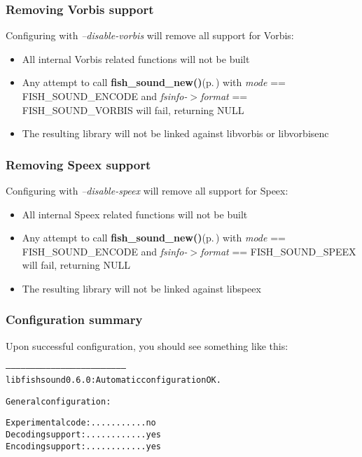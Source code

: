 \subsubsection{Removing Vorbis support}\label{no_vorbis}
Configuring with {\em --disable-vorbis\/} will remove all support for Vorbis:\begin{itemize}
\item All internal Vorbis related functions will not be built\item Any attempt to call {\bf fish\_\-sound\_\-new()}{\rm (p.\,\pageref{fishsound_8h_a4})} with {\em mode\/} == FISH\_\-SOUND\_\-ENCODE and {\em fsinfo-$>$format\/} == FISH\_\-SOUND\_\-VORBIS will fail, returning NULL\item The resulting library will not be linked against libvorbis or libvorbisenc\end{itemize}
\subsubsection{Removing Speex support}\label{no_speex}
Configuring with {\em --disable-speex\/} will remove all support for Speex:\begin{itemize}
\item All internal Speex related functions will not be built\item Any attempt to call {\bf fish\_\-sound\_\-new()}{\rm (p.\,\pageref{fishsound_8h_a4})} with {\em mode\/} == FISH\_\-SOUND\_\-ENCODE and {\em fsinfo-$>$format\/} == FISH\_\-SOUND\_\-SPEEX will fail, returning NULL\item The resulting library will not be linked against libspeex\end{itemize}
\subsubsection{Configuration summary}\label{summary}
Upon successful configuration, you should see something like this: \small\begin{alltt}
------------------------------------------------------------------------
  libfishsound 0.6.0:  Automatic configuration OK.\end{alltt}\normalsize 


\small\begin{alltt}  General configuration:\end{alltt}\normalsize 


\small\begin{alltt}    Experimental code: ........... no
    Decoding support: ............ yes
    Encoding support: ............ yes\end{alltt}\normalsize 



